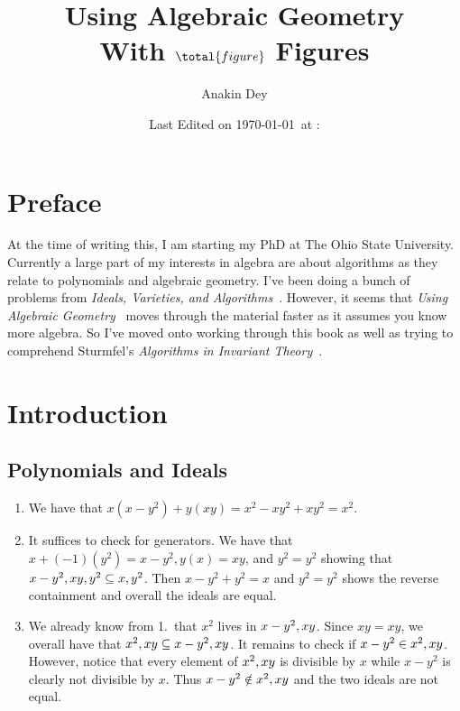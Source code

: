 \documentclass[letterpaper, 11pt, oneside]{book}
\title{\vspace{-100pt} {\Huge Using Algebraic Geometry} \\ {\small With $\total{figure}$ Figures}}
\author{\Large Anakin Dey}
\date{\small Last Edited on \today\ at \DTMfetchhour{now}:\DTMfetchminute{now}}
\newcommand{\CoverName}{Cover}
\begin{document}
\frontmatter
\renewcommand{\thepage}{\CoverName}
\maketitle


\tableofcontents
\clearpage


%

\chapter*{Preface}

At the time of writing this, I am starting my PhD at The Ohio State University.
Currently a large part of my interests in algebra are about algorithms as they relate to polynomials and algebraic geometry.
I've been doing a bunch of problems from \emph{Ideals, Varieties, and Algorithms}~\cite{book:IVA}.
However,  it seems that \emph{Using Algebraic Geometry}~\cite{book:UAG} moves through the material faster as it assumes you know more algebra.
So I've moved onto working through this book as well as trying to comprehend Sturmfel's \emph{Algorithms in Invariant Theory}~\cite{book:AlgosInInvTheory}.

\mainmatter

\chapter{Introduction}

\section{Polynomials and Ideals}

\begin{sol}\label{ex:UAG_1.1.1}
  \begin{enumerate}
    \item We have that $x(x - y^{2}) + y(xy) = x^{2} - xy^{2} + xy^{2} = x^{2}$.
    \item It suffices to check for generators.
          We have that $x + (-1)(y^{2}) = x - y^{2}, y(x) = xy$, and $y^{2} = y^{2}$ showing that $\ideal{x - y^{2}, xy, y^{2}} \subseteq \ideal{x, y^{2}}$.
          Then $x - y^{2} + y^{2} = x$ and $y^{2} = y^{2}$ shows the reverse containment and overall the ideals are equal.
    \item We already know from 1.\ that $x^{2}$ lives in $\ideal{x - y^{2}, xy}$.
          Since $xy = xy$, we overall have that $\ideal{x^{2}, xy} \subseteq \ideal{x - y^{2}, xy}$.
          It remains to check if $x - y^{2} \in \ideal{x^{2}, xy}$.
          However, notice that every element of $\ideal{x^{2}, xy}$ is divisible by $x$ while $x - y^{2}$ is clearly not divisible by $x$.
          Thus $x - y^{2} \notin \ideal{x^{2}, xy}$ and the two ideals are not equal.
  \end{enumerate}
\end{sol}
\end{document}
